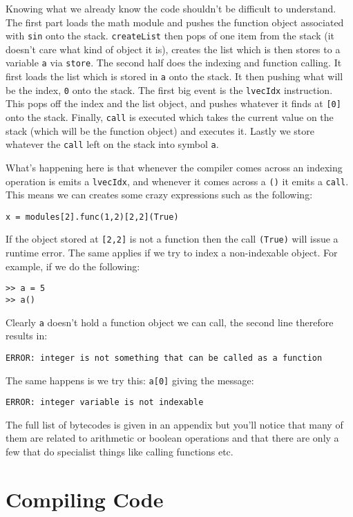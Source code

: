 Knowing what we already know the code shouldn't be difficult to understand. The first part loads the math module and pushes the function object associated with {\tt sin} onto the stack. {\tt createList} then pops of one item from the stack (it doesn't care what kind of object it is), creates the list which is then stores to a variable {\tt a} via {\tt store}. The second half does the indexing and function calling. It first loads the list which is stored in {\tt a} onto the stack. It then pushing what will be the index, {\tt 0} onto the stack. The first big event is the {\tt lvecIdx} instruction. This pops off the index and the list object, and pushes whatever it finds at {\tt [0]} onto the stack. Finally, {\tt call} is executed which takes the current value on the stack (which will be the function object) and executes it. Lastly we store whatever the {\tt call} left on the stack into symbol {\tt a}.

What's happening here is that whenever the compiler comes across an indexing operation is emits a {\tt lvecIdx}, and whenever it comes across a {\tt ()} it emits a {\tt call}. This means we can creates some crazy expressions such as the following:

\begin{lstlisting}
x = modules[2].func(1,2)[2,2](True)
\end{lstlisting}

If the object stored at {\tt [2,2]} is not a function then the call {\tt (True)} will issue a runtime error. The same applies if we try to index a non-indexable object. For example, if we do the following:

\begin{lstlisting}
>> a = 5
>> a()
\end{lstlisting}

Clearly {\tt a} doesn't hold a function object we can call, the second line therefore results in:

{\tt ERROR: integer is not something that can be called as a function}

The same happens is we try this: {\tt a[0]} giving the message:

{\tt ERROR: integer variable is not indexable}

The full list of bytecodes is given in an appendix but you'll notice that many of them are related to arithmetic or boolean operations and that there are only a few that do specialist things like calling functions etc.


\section{Compiling Code}

